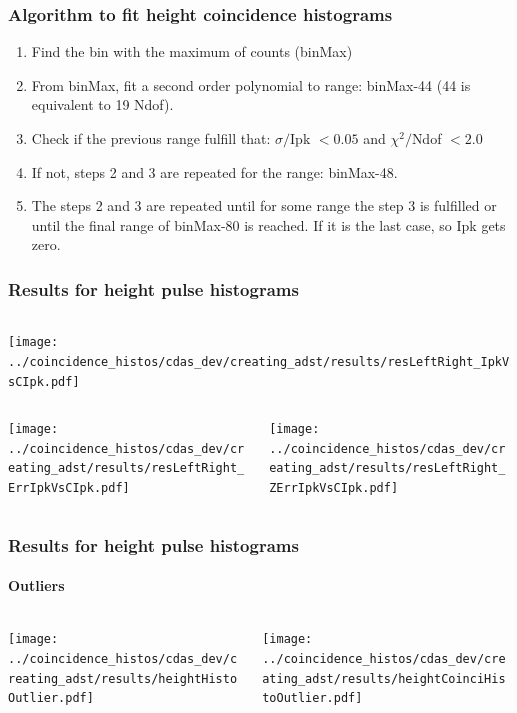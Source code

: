 \documentclass[aspectratio=169]{beamer}
\begin{document}
\begin{frame}
  \frametitle{Algorithm to fit height coincidence histograms}
  \begin{enumerate}
    \item Find the bin with the maximum of counts (binMax)           
    \item From binMax, fit a second order polynomial to range:
      binMax-44 (44 is equivalent to 19 Ndof).
    \item Check if the previous range fulfill that: $\sigma/$Ipk
      $<0.05$ and $\chi^2/$Ndof $<2.0$
    \item If not, steps 2 and 3 are repeated for the range:
      binMax-48.
    \item The steps 2 and 3 are repeated until for some range the
      step 3 is fulfilled or until the final range of binMax-80
      is reached. If it is the last case, so Ipk gets zero.
  \end{enumerate}
\end{frame}


\begin{frame}
  \frametitle{Results for height pulse histograms}

  \begin{columns}
    \centering
    \begin{column}{0.5\textwidth}
      \texttt{[image: ../coincidence\_histos/cdas\_dev/creating\_adst/results/resLeftRight\_IpkVsCIpk.pdf]}
    \end{column}
  \end{columns}

  \begin{columns}
    \centering
    \begin{column}{0.5\textwidth}
      \texttt{[image: ../coincidence\_histos/cdas\_dev/creating\_adst/results/resLeftRight\_ErrIpkVsCIpk.pdf]}
    \end{column}
    \begin{column}{0.5\textwidth}
      \texttt{[image: ../coincidence\_histos/cdas\_dev/creating\_adst/results/resLeftRight\_ZErrIpkVsCIpk.pdf]}
    \end{column}
  \end{columns}
\end{frame}


\begin{frame}
  \frametitle{Results for height pulse histograms}
  \framesubtitle{Outliers}
  \begin{columns}
    \centering
    \begin{column}{0.5\textwidth}
      \texttt{[image: ../coincidence\_histos/cdas\_dev/creating\_adst/results/heightHistoOutlier.pdf]}
    \end{column}
    \begin{column}{0.5\textwidth}
      \texttt{[image: ../coincidence\_histos/cdas\_dev/creating\_adst/results/heightCoinciHistoOutlier.pdf]}
    \end{column}
  \end{columns}
\end{frame}
\end{document}
